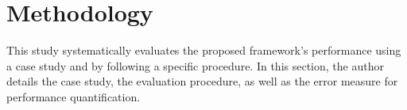 %
%

\chapter{Methodology}
\label{ch: methodology}

This study systematically evaluates the proposed framework's performance using a case study and by following a specific procedure.
In this section, the author details the case study, the evaluation procedure, as well as the error measure for performance quantification.



